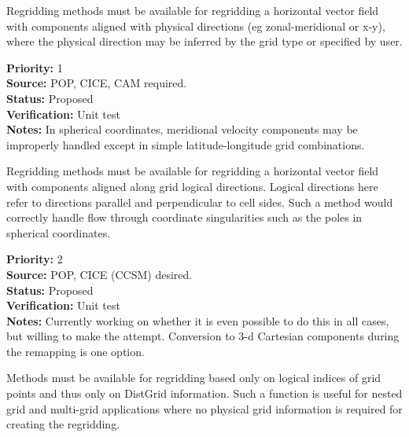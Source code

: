 
Regridding methods must be available for regridding a horizontal
vector field with components aligned with physical directions
(eg zonal-meridional or x-y), where the physical direction may be
inferred by the grid type or specified by user.

\begin{reqlist}
{\bf Priority:} 1 \\
{\bf Source:}  POP, CICE, CAM required. \\
{\bf Status:} Proposed \\
{\bf Verification:} Unit test \\
{\bf Notes:} In spherical coordinates, meridional velocity components
             may be improperly handled except in simple latitude-longitude
             grid combinations.
\end{reqlist}


Regridding methods must be available for regridding a horizontal
vector field with components aligned along grid logical directions.
Logical directions here refer to directions parallel and perpendicular
to cell sides.  Such a method would correctly handle flow through 
coordinate singularities such as the poles in spherical coordinates.

\begin{reqlist}
{\bf Priority:} 2 \\
{\bf Source:}  POP, CICE (CCSM) desired. \\
{\bf Status:} Proposed \\
{\bf Verification:} Unit test \\
{\bf Notes:} Currently working on whether it is even possible to do this
             in all cases, but willing to make the attempt.  Conversion to
             3-d Cartesian components during the remapping is one option.
\end{reqlist}


Methods must be available for regridding based
only on logical indices of grid points and thus only on DistGrid information.  
Such a function is useful for nested grid and multi-grid applications where 
no physical grid information is required for creating the regridding.


